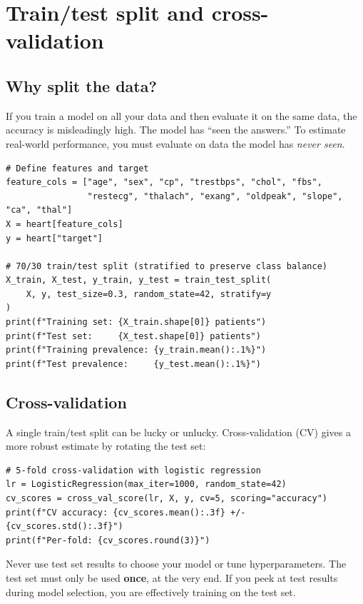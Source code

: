 \section{Train/test split and cross-validation}

\subsection{Why split the data?}

If you train a model on all your data and then evaluate it on the same data, the accuracy is misleadingly high. The model has ``seen the answers.'' To estimate real-world performance, you must evaluate on data the model has \emph{never seen}.

\begin{verbatim}
# Define features and target
feature_cols = ["age", "sex", "cp", "trestbps", "chol", "fbs",
                "restecg", "thalach", "exang", "oldpeak", "slope", "ca", "thal"]
X = heart[feature_cols]
y = heart["target"]

# 70/30 train/test split (stratified to preserve class balance)
X_train, X_test, y_train, y_test = train_test_split(
    X, y, test_size=0.3, random_state=42, stratify=y
)
print(f"Training set: {X_train.shape[0]} patients")
print(f"Test set:     {X_test.shape[0]} patients")
print(f"Training prevalence: {y_train.mean():.1%}")
print(f"Test prevalence:     {y_test.mean():.1%}")
\end{verbatim}

\subsection{Cross-validation}

A single train/test split can be lucky or unlucky. Cross-validation (CV) gives a more robust estimate by rotating the test set:

\begin{verbatim}
# 5-fold cross-validation with logistic regression
lr = LogisticRegression(max_iter=1000, random_state=42)
cv_scores = cross_val_score(lr, X, y, cv=5, scoring="accuracy")
print(f"CV accuracy: {cv_scores.mean():.3f} +/- {cv_scores.std():.3f}")
print(f"Per-fold: {cv_scores.round(3)}")
\end{verbatim}

\begin{warningbox}
Never use test set results to choose your model or tune hyperparameters. The test set must only be used \textbf{once}, at the very end. If you peek at test results during model selection, you are effectively training on the test set.
\end{warningbox}

